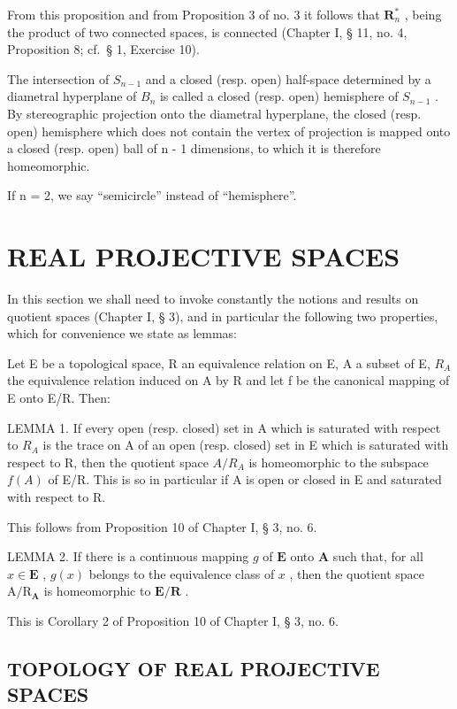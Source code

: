 From this proposition and from Proposition 3 of no. 3 it follows that \(\mathbf{R}_n^*\) , being the product of two connected spaces, is connected (Chapter I, § 11, no. 4, Proposition 8; cf.~§ 1, Exercise 10).

The intersection of \(S_{n-1}\) and a closed (resp. open) half-space determined by a diametral hyperplane of \(B_{n}\) is called a closed (resp. open) hemisphere of \(S_{n-1}\) . By stereographic projection onto the diametral hyperplane, the closed (resp. open) hemisphere which does not contain the vertex of projection is mapped onto a closed (resp. open) ball of n - 1 dimensions, to which it is therefore homeomorphic.

If n = 2, we say ``semicircle'' instead of ``hemisphere''.

\section{REAL PROJECTIVE SPACES}

In this section we shall need to invoke constantly the notions and results on quotient spaces (Chapter I, § 3), and in particular the following two properties, which for convenience we state as lemmas:

Let E be a topological space, R an equivalence relation on E, A a subset of E, \(R_{A}\) the equivalence relation induced on A by R and let f be the canonical mapping of E onto E/R. Then:

LEMMA 1. If every open (resp. closed) set in A which is saturated with respect to \(R_{A}\) is the trace on A of an open (resp. closed) set in E which is saturated with respect to R, then the quotient space \(A/R_{A}\) is homeomorphic to the subspace \(f(A)\) of E/R. This is so in particular if A is open or closed in E and saturated with respect to R.

This follows from Proposition 10 of Chapter I, § 3, no. 6.

LEMMA 2. If there is a continuous mapping \(g\) of \(\mathbf{E}\) onto \(\mathbf{A}\) such that, for all \(x \in \mathbf{E}\) , \(g(x)\) belongs to the equivalence class of \(x\) , then the quotient space \(\mathrm{A} / \mathrm{R}_{\mathbf{A}}\) is homeomorphic to \(\mathbf{E} / \mathbf{R}\) .

This is Corollary 2 of Proposition 10 of Chapter I, § 3, no. 6.

\subsection{TOPOLOGY OF REAL PROJECTIVE SPACES}

